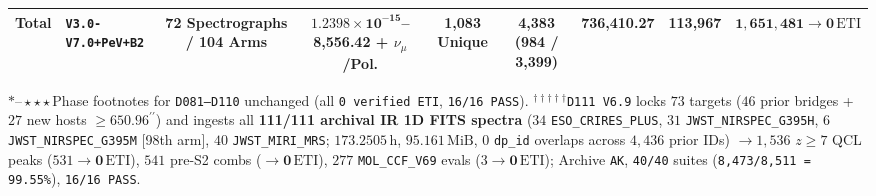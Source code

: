 \documentclass[twocolumn,10pt]{article}
\begin{document}
\begin{table}[t]
{\begin{tabular}{llccccccc}
\midrule
\textbf{Total} & \texttt{V3.0-V7.0+PeV+B2} & \textbf{72 Spectrographs / 104 Arms} & $\mathbf{1.2398\times 10^{-15}}$\textbf{--8,556.42 + $\nu_\mu$/Pol.} & \textbf{1,083 Unique} & \textbf{4,383 (984 / 3,399)} & \textbf{736,410.27} & \textbf{113,967} & $\mathbf{1{,}651{,}481 \rightarrow 0\,\mathrm{ETI}}$ \\
\bottomrule
\end{tabular}%
}
\par\smallskip\scriptsize{${\ast\text{--}\star\star\star}$Phase footnotes for \texttt{D081--D110} unchanged (all \texttt{0 verified ETI}, \texttt{16/16 PASS}). $^{\dagger\dagger\dagger\dagger\dagger}$\texttt{D111 V6.9} locks $73$ targets ($46$ prior bridges + $27$ new hosts $\ge 650.96^{\prime\prime}$) and ingests all \textbf{111/111 archival IR 1D FITS spectra} ($34$ \texttt{ESO\_CRIRES\_PLUS}, $31$ \texttt{JWST\_NIRSPEC\_G395H}, $6$ \texttt{JWST\_NIRSPEC\_G395M} [98th arm], $40$ \texttt{JWST\_MIRI\_MRS}; $173.2505\,\text{h}$, $95.161\,\mathrm{MiB}$, $0$ \texttt{dp\_id} overlaps across $4{,}436$ prior IDs) $\rightarrow 1{,}536$ $z\ge 7$ QCL peaks ($531\rightarrow \mathbf{0\,\mathrm{ETI}}$), $541$ pre-S2 combs ($\rightarrow \mathbf{0\,\mathrm{ETI}}$), $277$ \texttt{MOL\_CCF\_V69} evals ($3\rightarrow \mathbf{0\,\mathrm{ETI}}$); Archive \texttt{AK}, \texttt{40/40} suites (\texttt{8,473/8,511 = 99.55\%}), \texttt{16/16 PASS}.}
\end{table}
\end{document}
